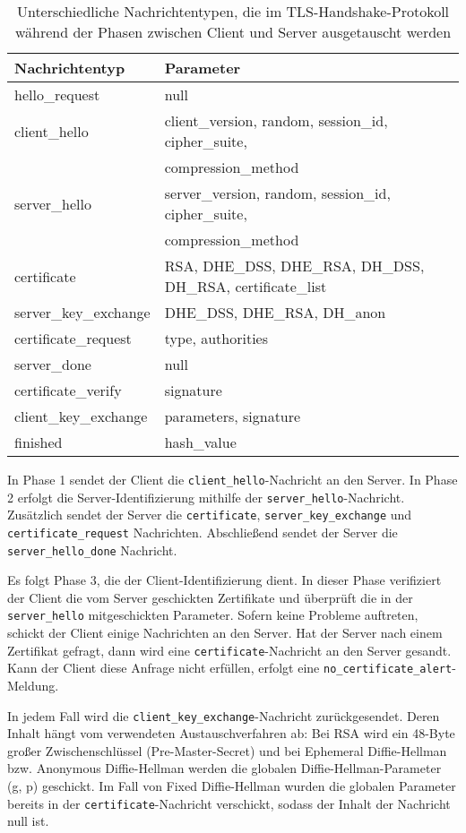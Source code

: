 \documentclass[12pt]{scrartcl}
\begin{document}
\begin{table}
	\caption{Unterschiedliche Nachrichtentypen, die im TLS-Handshake-Protokoll während der Phasen zwischen Client und Server ausgetauscht werden}
	\label{tab:handshake-1}
	\begin{tabular}{|l|l|}
		\hline
		Nachrichtentyp & Parameter \\
		\hline
		hello\_request & null \\
		client\_hello & client\_version, random, session\_id, cipher\_suite, \\
		& compression\_method \\
		server\_hello & server\_version, random, session\_id, cipher\_suite, \\
		& compression\_method \\
		certificate & RSA, DHE\_DSS, DHE\_RSA, DH\_DSS, DH\_RSA, certificate\_list \\
		server\_key\_exchange & DHE\_DSS, DHE\_RSA, DH\_anon \\
		certificate\_request & type, authorities \\
		server\_done & null \\
		certificate\_verify & signature \\
		client\_key\_exchange & parameters, signature \\
		finished & hash\_value \\
		\hline
	\end{tabular}
\end{table}

In Phase 1 sendet der Client die \texttt{client\_hello}-Nachricht an den Server. In Phase 2 erfolgt die Server-Identifizierung mithilfe der \texttt{server\_hello}-Nachricht. Zusätzlich sendet der Server die \texttt{certificate}, \texttt{server\_key\_exchange} und \texttt{certificate\_request} Nachrichten. Abschließend sendet der Server die \texttt{server\_hello\_done} Nachricht. 

Es folgt Phase 3, die der Client-Identifizierung dient. In dieser Phase verifiziert der Client die vom Server geschickten Zertifikate und überprüft die in der \texttt{server\_hello} mitgeschickten Parameter. Sofern keine Probleme auftreten, schickt der Client einige Nachrichten an den Server. Hat der Server nach einem Zertifikat gefragt, dann wird eine \texttt{certificate}-Nachricht an den Server gesandt. Kann der Client diese Anfrage nicht erfüllen, erfolgt eine \texttt{no\_certificate\_alert}-Meldung. 

In jedem Fall wird die \texttt{client\_key\_exchange}-Nachricht zurückgesendet. Deren Inhalt hängt vom verwendeten Austauschverfahren ab: Bei RSA wird ein 48-Byte großer Zwischenschlüssel (Pre-Master-Secret) und bei Ephemeral Diffie-Hellman bzw. Anonymous Diffie-Hellman werden die globalen Diffie-Hellman-Parameter (g, p) geschickt. Im Fall von Fixed Diffie-Hellman wurden die globalen Parameter bereits in der \texttt{certificate}-Nachricht verschickt, sodass der Inhalt der Nachricht null ist.
\end{document}
